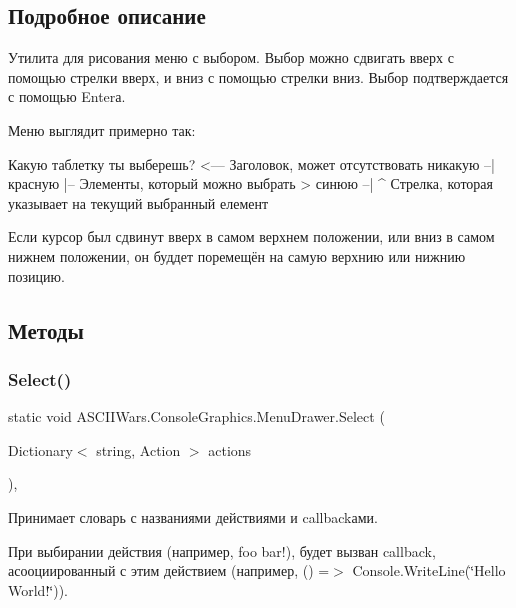 \subsection{Подробное описание}
Утилита для рисования меню с выбором. Выбор можно сдвигать вверх с помощью стрелки вверх, и вниз с помощью стрелки вниз. Выбор подтверждается с помощью Enter\textquotesingle{}а. 

Меню выглядит примерно так\+: 
\begin{DoxyCode}
 Какую таблетку ты выберешь?     <--- Заголовок, может отсутствовать
   никакую --|
   красную   |-- Элементы, который можно выбрать
 > синюю   --|
 ^
Стрелка, которая указывает на текущий выбранный елемент
\end{DoxyCode}


Если курсор был сдвинут вверх в самом верхнем положении, или вниз в самом нижнем положении, он буддет поремещён на самую верхнию или нижнию позицию. 

\subsection{Методы}
\hypertarget{class_a_s_c_i_i_wars_1_1_console_graphics_1_1_menu_drawer_a2c8b1f60df7a915364bc4c0244599aa1}{}\label{class_a_s_c_i_i_wars_1_1_console_graphics_1_1_menu_drawer_a2c8b1f60df7a915364bc4c0244599aa1} 
\subsubsection{\texorpdfstring{Select()}{Select()}\hspace{0.1cm}{\footnotesize\ttfamily [1/4]}}
{\footnotesize\ttfamily static void A\+S\+C\+I\+I\+Wars.\+Console\+Graphics.\+Menu\+Drawer.\+Select (\begin{DoxyParamCaption}\item[{Dictionary$<$ string, Action $>$}]{actions }\end{DoxyParamCaption})\hspace{0.3cm}{\ttfamily [inline]}, {\ttfamily [static]}}



Принимает словарь с названиями действиями и callback\textquotesingle{}ами. 

При выбирании действия (например, {\ttfamily foo bar!}), будет вызван callback, асооциированный с этим действием (например, {\ttfamily () =$>$ Console.\+Write\+Line(\char`\"{}\+Hello World!\char`\"{})}). \hypertarget{class_a_s_c_i_i_wars_1_1_console_graphics_1_1_menu_drawer_a5870384104321c1a9e954514ebd11b3a}{}\label{class_a_s_c_i_i_wars_1_1_console_graphics_1_1_menu_drawer_a5870384104321c1a9e954514ebd11b3a} 
